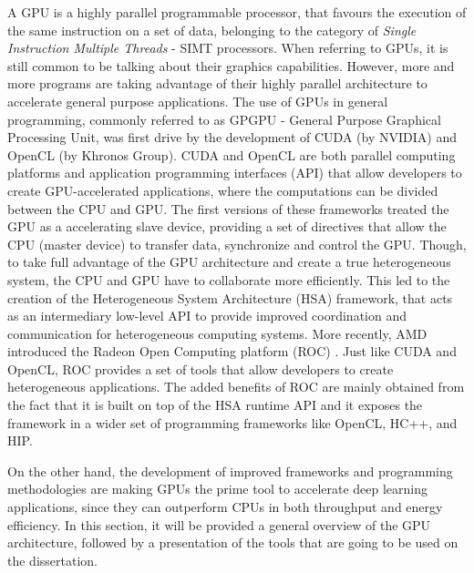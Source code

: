 A GPU is a highly parallel programmable processor, that favours the execution of the same instruction on a set of data, belonging to the category of \textit{Single Instruction Multiple Threads} - SIMT processors. When referring to GPUs, it is still common to be talking about their graphics capabilities. However, more and more programs are taking advantage of their highly parallel architecture to accelerate general purpose applications. The use of GPUs in general programming, commonly referred to as GPGPU - General Purpose Graphical Processing Unit, was first drive by the development of CUDA \cite{nvidia_cuda_2017} (by NVIDIA) and OpenCL \cite{noauthor_opencl_2013} (by Khronos Group). CUDA and OpenCL are both parallel computing platforms and application programming interfaces (API) that allow developers to create GPU-accelerated applications, where the computations can be divided between the CPU and GPU. The first versions of these frameworks treated the GPU as a accelerating slave device, providing a set of directives that allow the CPU (master device) to transfer data, synchronize and control the GPU.  Though, to take full advantage of the GPU architecture and create a true heterogeneous system, the CPU and GPU have to collaborate more efficiently. This led to the creation of the Heterogeneous System Architecture (HSA) \cite{hwu_heterogeneous_2015} framework, that acts as an intermediary low-level API to provide improved coordination and communication for heterogeneous computing systems.  More recently, AMD introduced the Radeon Open Computing platform (ROC) \cite{noauthor_radeonopencompute/rocm_2019}. Just like CUDA and OpenCL, ROC provides a set of tools that allow developers to create heterogeneous applications. The added benefits of ROC are  mainly obtained from the fact that it is built on top of the HSA runtime API and it exposes the framework in a wider set of programming frameworks like OpenCL, HC++, and HIP.

On the other hand, the development of improved frameworks and programming methodologies are making GPUs the prime tool to accelerate deep learning applications, since they can outperform CPUs in both throughput and energy efficiency. In this section, it will be provided a general overview of the GPU architecture, followed by a presentation of the tools that are going to be used on the dissertation.


